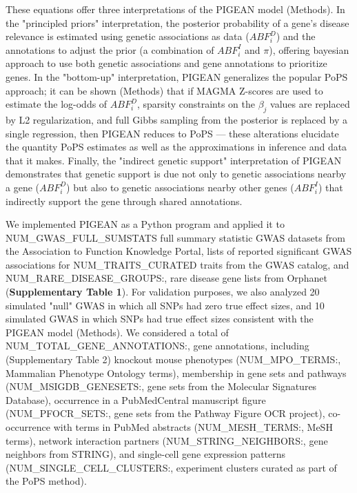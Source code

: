 These equations offer three interpretations of the PIGEAN model (Methods). In the "principled priors" interpretation, the posterior probability of a gene's disease relevance is estimated using genetic associations as data ($ABF_i^D$) and the annotations to adjust the prior (a combination of $ABF_i^I$ and $\pi$), offering bayesian approach to use both genetic associations and gene annotations to prioritize genes. In the "bottom-up" interpretation, PIGEAN generalizes the popular PoPS approach; it can be shown (Methods) that if MAGMA Z-scores are used to estimate the log-odds of $ABF_i^D$, sparsity constraints on the $\beta_j$ values are replaced by L2 regularization, and full Gibbs sampling from the posterior is replaced by a single regression, then PIGEAN reduces to PoPS --- these alterations elucidate the quantity PoPS  estimates as well as the approximations in inference and data that it makes. Finally, the "indirect genetic support" interpretation of PIGEAN demonstrates that genetic support is due not only to genetic associations nearby a gene ($ABF_i^D$) but also to genetic associations nearby other genes ($ABF_i^I$) that indirectly support the gene through shared annotations.

We implemented PIGEAN as a Python program and applied it to {{NUM_GWAS_FULL_SUMSTATS}} full summary statistic GWAS datasets from the Association to Function Knowledge Portal, lists of reported significant GWAS associations for {{NUM_TRAITS_CURATED}} traits from the GWAS catalog, and {{NUM_RARE_DISEASE_GROUPS:,}} rare disease gene lists from Orphanet (\textbf{Supplementary Table 1}). For validation purposes, we also analyzed 20 simulated "null" GWAS in which all SNPs had zero true effect sizes, and 10 simulated GWAS in which SNPs had true effect sizes consistent with the PIGEAN model (Methods). We considered a total of {{NUM_TOTAL_GENE_ANNOTATIONS:,}} gene annotations, including (Supplementary Table 2) knockout mouse phenotypes ({{NUM_MPO_TERMS:,}} Mammalian Phenotype Ontology terms), membership in gene sets and pathways ({{NUM_MSIGDB_GENESETS:,}} gene sets from the Molecular Signatures Database), occurrence in a PubMedCentral manuscript figure ({{NUM_PFOCR_SETS:,}} gene sets from the Pathway Figure OCR project), co-occurrence with terms in PubMed abstracts ({{NUM_MESH_TERMS:,}} MeSH terms), network interaction partners ({{NUM_STRING_NEIGHBORS:,}} gene neighbors from STRING), and single-cell gene expression patterns ({{NUM_SINGLE_CELL_CLUSTERS:,}} experiment clusters curated as part of the PoPS method).

